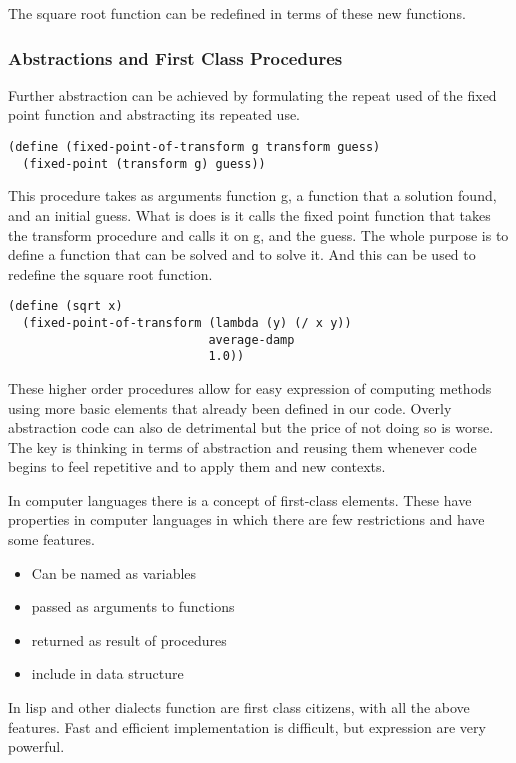 \documentclass[11pt]{article}
\begin{document}
The square root function can be redefined in terms of these new
functions.

\subsubsection{Abstractions and First Class Procedures}
\label{sec:org9f58054}
Further abstraction can be achieved by formulating the repeat used of
the fixed point function and abstracting its repeated use.

\begin{verbatim}
(define (fixed-point-of-transform g transform guess)
  (fixed-point (transform g) guess))
\end{verbatim}

This procedure takes as arguments function g, a function that a solution
found, and an initial guess. What is does is it calls the fixed point
function that takes the transform procedure and calls it on g, and the
guess. The whole purpose is to define a function that can be solved and
to solve it. And this can be used to redefine the square root function.

\begin{verbatim}
(define (sqrt x)
  (fixed-point-of-transform (lambda (y) (/ x y))
                            average-damp
                            1.0))
\end{verbatim}

These higher order procedures allow for easy expression of computing
methods using more basic elements that already been defined in our code.
Overly abstraction code can also de detrimental but the price of not
doing so is worse. The key is thinking in terms of abstraction and
reusing them whenever code begins to feel repetitive and to apply them
and new contexts.

In computer languages there is a concept of first-class elements. These
have properties in computer languages in which there are few
restrictions and have some features.

\begin{itemize}
\item Can be named as variables
\item passed as arguments to functions
\item returned as result of procedures
\item include in data structure
\end{itemize}

In lisp and other dialects function are first class citizens, with all
the above features. Fast and efficient implementation is difficult, but
expression are very powerful.
\end{document}
